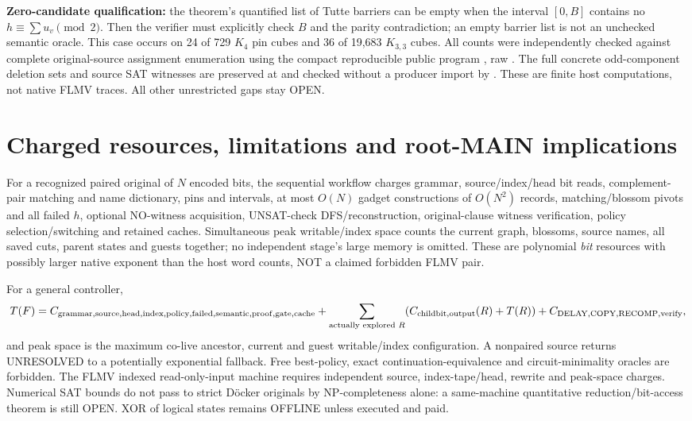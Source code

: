 \documentclass[11pt]{article}
\begin{document}
\noindent\textbf{Zero-candidate qualification:} the theorem's quantified list of Tutte barriers can be empty when the interval $[0,B]$ contains no $h\equiv\sum u_v\pmod2$. Then the verifier must explicitly check $B$ and the parity contradiction; an empty barrier list is not an unchecked semantic oracle. This case occurs on 24 of 729 $K_4$ pin cubes and 36 of 19,683 $K_{3,3}$ cubes. All counts were independently checked against complete original-source assignment enumeration using the compact reproducible public program , raw . The full concrete odd-component deletion sets and source SAT witnesses are preserved at  and checked without a producer import by . These are finite host computations, not native FLMV traces. All other unrestricted gaps stay OPEN.

\section{Charged resources, limitations and root-MAIN implications}
For a recognized paired original of $N$ encoded bits, the sequential workflow charges grammar, source/index/head bit reads, complement-pair matching and name dictionary, pins and intervals, at most $O(N)$ gadget constructions of $O(N^2)$ records, matching/blossom pivots and all failed $h$, optional NO-witness acquisition, UNSAT-check DFS/reconstruction, original-clause witness verification, policy selection/switching and retained caches. Simultaneous peak writable/index space counts the current graph, blossoms, source names, all saved cuts, parent states and guests together; no independent stage's large memory is omitted. These are polynomial \emph{bit} resources with possibly larger native exponent than the host word counts, NOT a claimed forbidden FLMV pair.

For a general controller,
\[
T(F)=C_{\rm grammar,source,head,index,policy,failed,semantic,proof,gate,cache}
+\sum_{\text{actually explored }R}(C_{\rm childbit,output}(R)+T(R))
+C_{\rm DELAY,COPY,RECOMP,verify},
\]
and peak space is the maximum co-live ancestor, current and guest writable/index configuration. A nonpaired source returns UNRESOLVED to a potentially exponential fallback. Free best-policy, exact continuation-equivalence and circuit-minimality oracles are forbidden. The FLMV indexed read-only-input machine requires independent source, index-tape/head, rewrite and peak-space charges. Numerical SAT bounds do not pass to strict D\"ocker originals by NP-completeness alone: a same-machine quantitative reduction/bit-access theorem is still OPEN. XOR of logical states remains OFFLINE unless executed and paid.
\end{document}

